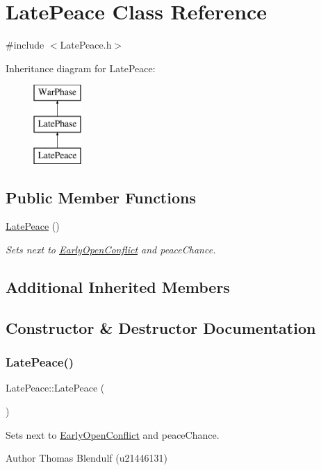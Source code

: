 \hypertarget{class_late_peace}{}\section{Late\+Peace Class Reference}
\label{class_late_peace}


{\ttfamily \#include $<$Late\+Peace.\+h$>$}

Inheritance diagram for Late\+Peace\+:\begin{figure}[H]
\begin{center}
\leavevmode
\includegraphics[height=3.000000cm]{class_late_peace}
\end{center}
\end{figure}
\subsection*{Public Member Functions}
\begin{DoxyCompactItemize}
\item 
\mbox{\hyperlink{class_late_peace_ab05374df0f30902d891e4b939b56f10b}{Late\+Peace}} ()
\begin{DoxyCompactList}\small\item\em Sets next to \mbox{\hyperlink{class_early_open_conflict}{Early\+Open\+Conflict}} and peace\+Chance. \end{DoxyCompactList}\end{DoxyCompactItemize}
\subsection*{Additional Inherited Members}


\subsection{Constructor \& Destructor Documentation}
\mbox{\label{class_late_peace_ab05374df0f30902d891e4b939b56f10b}} 
\subsubsection{\texorpdfstring{LatePeace()}{LatePeace()}}
{\footnotesize\ttfamily Late\+Peace\+::\+Late\+Peace (\begin{DoxyParamCaption}{ }\end{DoxyParamCaption})}



Sets next to \mbox{\hyperlink{class_early_open_conflict}{Early\+Open\+Conflict}} and peace\+Chance. 

\begin{DoxyAuthor}{Author}
Thomas Blendulf (u21446131) 
\end{DoxyAuthor}
